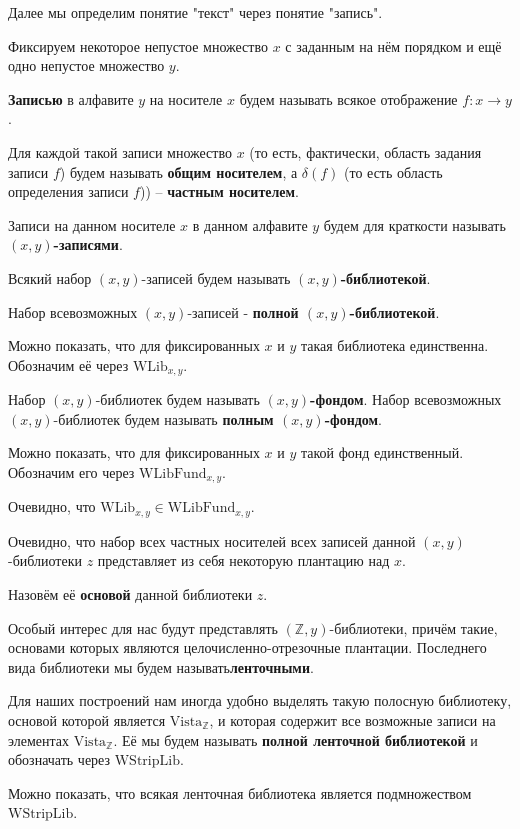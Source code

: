 \documentclass[a4paper]{article}
\begin{document}
Далее мы определим понятие "текст" через понятие "запись".

Фиксируем некоторое непустое множество $x$ с заданным на нём порядком и ещё одно непустое множество $y$.

\textbf{Записью} в алфавите $y$ на носителе $x$ будем называть всякое отображение $f: x \rightarrow y$.

Для каждой такой записи множество $x$ (то есть, фактически, область задания записи $f$) будем называть \textbf{общим носителем}, а $\delta(f)$ (то есть область определения записи $f$)) -- \textbf{частным носителем}.

Записи на данном носителе $x$ в данном алфавите $y$ будем для краткости называть \textbf{$(x,y)$-записями}.

Всякий набор $(x,y)$-записей будем называть \textbf{$(x,y)$-библиотекой}.

Набор всевозможных $(x,y)$-записей - \textbf{полной $(x,y)$-библиотекой}.

Можно показать, что для фиксированных $x$ и $y$ такая библиотека единственна. Обозначим её через $\mathrm{WLib}_{x,y}$.

Набор $(x,y)$-библиотек будем называть \textbf{$(x,y)$-фондом}. Набор всевозможных $(x,y)$-библиотек будем называть \textbf{полным $(x,y)$-фондом}.

Можно показать, что для фиксированных $x$ и $y$ такой фонд единственный. Обозначим его через $\mathrm{WLibFund}_{x,y}$.

Очевидно, что $\mathrm{WLib}_{x,y} \in \mathrm{WLibFund}_{x,y}$.

Очевидно, что набор всех частных носителей всех записей данной $(x,y)$-библиотеки $z$ представляет из себя некоторую плантацию над $x$.

Назовём её \textbf{основой} данной библиотеки $z$.

Особый интерес для нас будут представлять $(\mathbb{Z},y)$-библиотеки, причём такие, основами которых являются целочисленно-отрезочные плантации. Последнего вида библиотеки мы будем называть\textbf{ленточными}.

Для наших построений нам иногда удобно выделять такую полосную библиотеку, основой которой является $\mathrm{Vista}_{\mathbb{Z}}$, и которая содержит все возможные записи на элементах $\mathrm{Vista}_{\mathbb{Z}}$. Её мы будем называть \textbf{полной ленточной библиотекой} и обозначать через $\mathrm{WStripLib}$.

Можно показать, что всякая ленточная библиотека является подмножеством $\mathrm{WStripLib}$.
\end{document}
